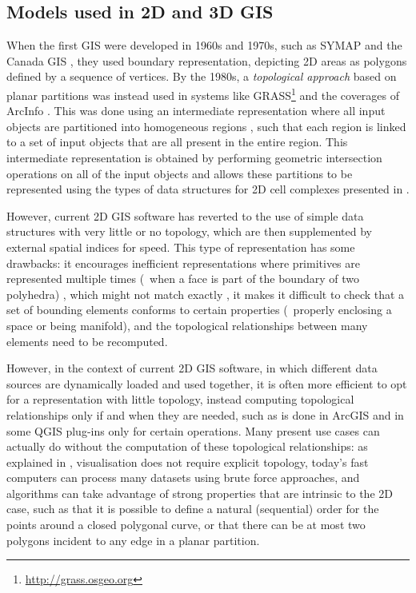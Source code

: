 \subsection{Models used in 2D and 3D GIS}

When the first GIS were developed in 1960s and 1970s, such as SYMAP \citep{Chrisman88} and the Canada GIS \citep{Tomlinson88}, they used boundary representation, depicting 2D areas as polygons defined by a sequence of vertices.
By the 1980s, a \emph{topological approach} based on planar partitions was instead used in systems like GRASS\footnote{\url{http://grass.osgeo.org}} and the coverages of ArcInfo \citep{ESRITopology}.
This was done using an intermediate representation where all input objects are partitioned into homogeneous regions \citep{Rossignac89}, such that each region is linked to a set of input objects that are all present in the entire region.
This intermediate representation is obtained by performing geometric intersection operations on all of the input objects and allows these partitions to be represented using the types of data structures for 2D cell complexes presented in .

However, current 2D GIS software has reverted to the use of simple data structures with very little or no topology, which are then supplemented by external spatial indices for speed.
This type of representation has some drawbacks: it encourages inefficient representations where primitives are represented multiple times (\eg\ when a face is part of the boundary of two polyhedra) \citep[Ch.~3]{Cromley92}, which might not match exactly \citep{delaLosa99}, it makes it difficult to check that a set of bounding elements conforms to certain properties (\eg\ properly enclosing a space or being manifold), and the topological relationships between many elements need to be recomputed.

However, in the context of current 2D GIS software, in which different data sources are dynamically loaded and used together, it is often more efficient to opt for a representation with little topology, instead computing topological relationships only if and when they are needed, such as is done in ArcGIS \citep{ESRITopology} and in some QGIS plug-ins only for certain operations.
Many present use cases can actually do without the computation of these topological relationships: as explained in , visualisation does not require explicit topology, today's fast computers can process many datasets using brute force approaches, and algorithms can take advantage of strong properties that are intrinsic to the 2D case, such as that it is possible to define a natural (sequential) order for the points around a closed polygonal curve, or that there can be at most two polygons incident to any edge in a planar partition.

